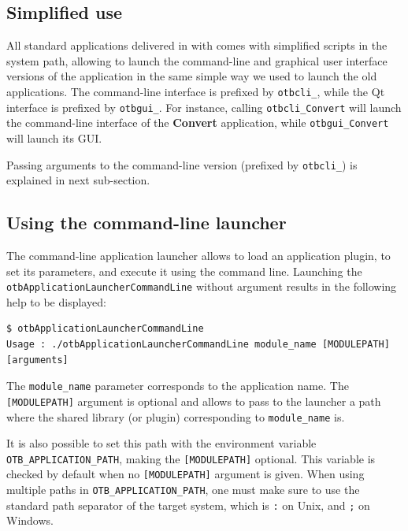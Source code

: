 \subsection{Simplified use}

All standard applications delivered in with \otb comes with simplified
scripts in the system path, allowing to launch the command-line and
 graphical user interface versions of the application in the same simple way
 we used to launch the old applications. The command-line interface is prefixed by
\verb?otbcli_?, while the Qt interface is prefixed by
\verb?otbgui_?. For instance, calling \verb?otbcli_Convert? will
launch the command-line interface of the \textbf{Convert} application,
while \verb?otbgui_Convert? will launch its GUI.


Passing arguments to the command-line version (prefixed by
\verb?otbcli_?) is explained in next sub-section.

\subsection{Using the command-line launcher}

The command-line application launcher allows to load an application
plugin, to set its parameters, and execute it using the command
line. Launching the \verb?otbApplicationLauncherCommandLine?
without argument results in the following help to be displayed:

\begin{verbatim}
$ otbApplicationLauncherCommandLine 
Usage : ./otbApplicationLauncherCommandLine module_name [MODULEPATH] [arguments]
\end{verbatim} 

The \verb?module_name? parameter corresponds to the application
name. The \verb?[MODULEPATH]? argument is optional and allows 
to pass to the launcher a path where the shared library (or plugin) 
corresponding to \verb?module_name? is.

It is also possible to set this path with the environment variable 
\verb?OTB_APPLICATION_PATH?, making the \verb?[MODULEPATH]? optional.
This variable is checked by default when 
no \verb?[MODULEPATH]? argument is given.
When using multiple paths in \verb?OTB_APPLICATION_PATH?, one must make sure to use
the standard path separator of the target system, which is \verb?:? on Unix, and \verb?;? on Windows.


